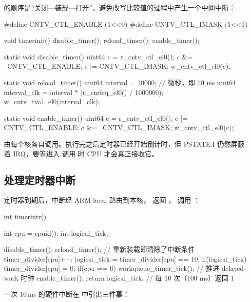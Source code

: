  的顺序是“关闭—装载—打开”，避免改写比较值的过程中产生一个中间中断：

\begin{ccode}
#define CNTV_CTL_ENABLE   (1<<0)
#define CNTV_CTL_IMASK    (1<<1)

void timerinit()
{
  disable_timer();
  reload_timer();
  enable_timer();
}

static void disable_timer()
{
  uint64 c = r_cntv_ctl_el0();
  c &= ~CNTV_CTL_ENABLE;
  c |= CNTV_CTL_IMASK;
  w_cntv_ctl_el0(c);
}

static void reload_timer()
{
  uint64 interval = 10000;                                   // 微秒，即 10 ms
  uint64 interval_clk = interval * (r_cntfrq_el0() / 1000000);
  w_cntv_tval_el0(interval_clk);
}

static void enable_timer()
{
  uint64 c = r_cntv_ctl_el0();
  c |= CNTV_CTL_ENABLE;
  c &= ~CNTV_CTL_IMASK;
  w_cntv_ctl_el0(c);
}
\end{ccode}

 由每个核各自调用。执行完之后定时器已经开始倒计时，但 PSTATE.I 仍然屏蔽着 IRQ，要等进入  调用  时 CPU 才会真正接收它。

\subsection{处理定时器中断}

定时器到期后，中断经 ARM-local 路由到本核， 返回 ， 调用 ：

\begin{ccode}
int timerintr()
{
  int cpu = cpuid();
  int logical_tick;

  disable_timer();
  reload_timer();                       // 重新装载即清除了中断条件
  timer_divider[cpu]++;
  logical_tick = timer_divider[cpu] == 10;
  if(logical_tick)
    timer_divider[cpu] = 0;
  if(cpu == 0)
    workqueue_timer_tick();             // 推进 delayed-work 时钟
  enable_timer();
  return logical_tick;                  // 每 10 次（100 ms）返回 1
}
\end{ccode}

一次 10\,ms 的硬件中断在  中引出三件事：

